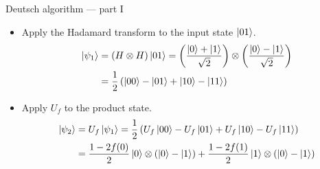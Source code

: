
\begin{frame}{Deutsch algorithm --- part I}
\begin{itemize}
\item Apply the Hadamard transform to the input state $\ket{01}$. 
\begin{equation*}
\begin{split}
\ket{\psi_1} &= \left(H \otimes H\right) \ket{01} = \left( \frac{\ket{0} + \ket{1}}{\sqrt{2}}\right) \otimes \left( \frac{\ket{0} - \ket{1}}{\sqrt{2}}\right) \\
& =\frac{1}{2} \left( \ket{00} - \ket{01}+ \ket{10} - \ket{11} \right)
\end{split}
\end{equation*}

\item Apply $U_f$ to the product state.
\begin{equation*}
\begin{split}
\ket{\psi_2} &= 
U_f \ket{\psi_1}
=   \frac{1}{2} \left( U_f\ket{00} - U_f \ket{01}+ U_f \ket{10} - U_f \ket{11} \right) \\
&= \frac{1-2f(0)}{2}  \ket{0} \otimes (\ket{0}- \ket{1})  
 + \frac{1-2f(1)}{2}  \ket{1} \otimes (\ket{0}- \ket{1})
\end{split}
\end{equation*}
\end{itemize}
\end{frame}


